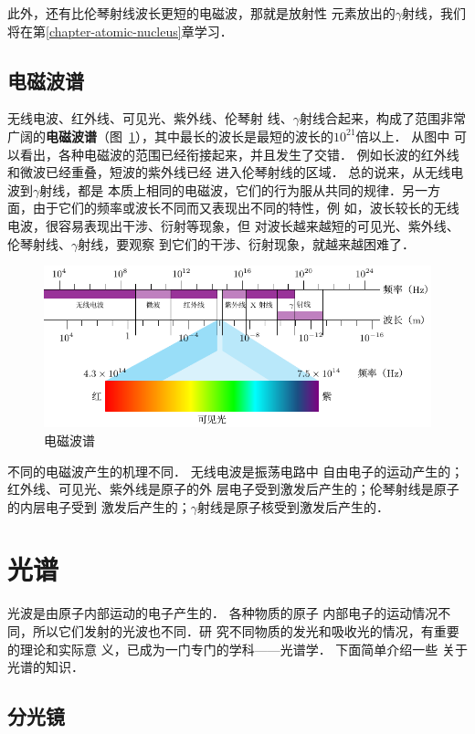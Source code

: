 此外，还有比伦琴射线波长更短的电磁波，那就是放射性
元素放出的$\gamma$射线，我们将在第\ref{chapter-atomic-nucleus}章学习．

\subsection{电磁波谱}

无线电波、红外线、可见光、紫外线、伦琴射
线、$\gamma$射线合起来，构成了范围非常广阔的\textbf{电磁波谱}（图~\ref{fig_C_6-17}），其中最长的波长是最短的波长的$10^{21}$倍以上．
从图中
可以看出，各种电磁波的范围已经衔接起来，并且发生了交错．
例如长波的红外线和微波已经重叠，短波的紫外线已经
进入伦琴射线的区域．
总的说来，从无线电波到$\gamma$射线，都是
本质上相同的电磁波，它们的行为服从共同的规律．另一方
面，由于它们的频率或波长不同而又表现出不同的特性，例
如，波长较长的无线电波，很容易表现出干涉、衍射等现象，但
对波长越来越短的可见光、紫外线、伦琴射线、$\gamma$射线，要观察
到它们的干涉、衍射现象，就越来越困难了．

\begin{figure}[htbp]
    \centering
    \includegraphics{fig/C/6-17.pdf}
    \caption{电磁波谱}\label{fig_C_6-17}
\end{figure}

不同的电磁波产生的机理不同．
无线电波是振荡电路中
自由电子的运动产生的；红外线、可见光、紫外线是原子的外
层电子受到激发后产生的；伦琴射线是原子的内层电子受到
激发后产生的；$\gamma$射线是原子核受到激发后产生的．

\section{光谱}
光波是由原子内部运动的电子产生的．
各种物质的原子
内部电子的运动情况不同，所以它们发射的光波也不同．研
究不同物质的发光和吸收光的情况，有重要的理论和实际意
义，已成为一门专门的学科——光谱学．
下面简单介绍一些
关于光谱的知识．

\subsection{分光镜}


